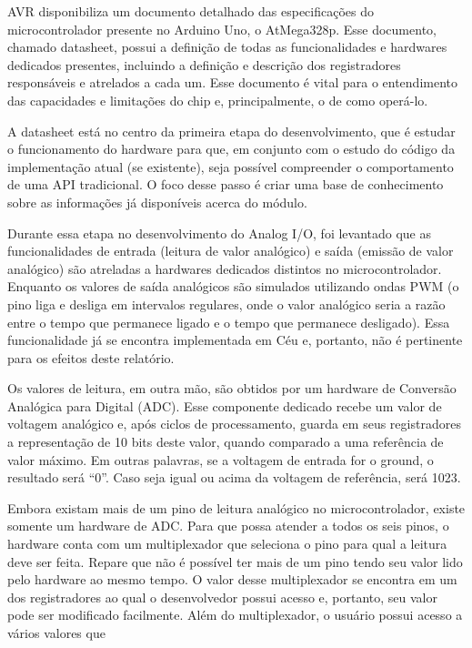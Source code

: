 \documentclass{article}
\begin{document}
\tab AVR disponibiliza um documento detalhado \cite{wortmann2015} das especificações do microcontrolador presente no
Arduino Uno, o AtMega328p. Esse documento, chamado datasheet, possui a definição de todas as
funcionalidades e hardwares dedicados presentes, incluindo a definição e descrição dos registradores
responsáveis e atrelados a cada um. Esse documento é vital para o entendimento das capacidades e
limitações do chip e, principalmente, o de como operá-lo.
\par A datasheet está no centro da primeira etapa do desenvolvimento, que é estudar o funcionamento do
hardware para que, em conjunto com o estudo do código da implementação atual (se existente), seja
possível compreender o comportamento de uma API tradicional. O foco desse passo é criar uma
base de conhecimento sobre as informações já disponíveis acerca do módulo.
\par Durante essa etapa no desenvolvimento do Analog I/O, foi levantado que as funcionalidades de
entrada (leitura de valor analógico) e saída (emissão de valor analógico) são atreladas a hardwares
dedicados distintos no microcontrolador. Enquanto os valores de saída analógicos são simulados
utilizando ondas PWM (o pino liga e desliga em intervalos regulares, onde o valor analógico seria a
razão entre o tempo que permanece ligado e o tempo que permanece desligado). Essa funcionalidade
já se encontra implementada em Céu e, portanto, não é pertinente para os efeitos deste relatório.
\par Os valores de leitura, em outra mão, são obtidos por um hardware de Conversão Analógica para
Digital (ADC). Esse componente dedicado recebe um valor de voltagem analógico e, após ciclos de
processamento, guarda em seus registradores a representação de 10 bits deste valor, quando
comparado a uma referência de valor máximo. Em outras palavras, se a voltagem de entrada for o
ground, o resultado será “0”. Caso seja igual ou acima da voltagem de referência, será 1023.
\par Embora existam mais de um pino de leitura analógico no microcontrolador, existe somente um
hardware de ADC. Para que possa atender a todos os seis pinos, o hardware conta com um
multiplexador que seleciona o pino para qual a leitura deve ser feita. Repare que não é possível ter
mais de um pino tendo seu valor lido pelo hardware ao mesmo tempo. O valor desse multiplexador se
encontra em um dos registradores ao qual o desenvolvedor possui acesso e, portanto, seu valor pode
ser modificado facilmente. Além do multiplexador, o usuário possui acesso a vários valores que
\end{document}
